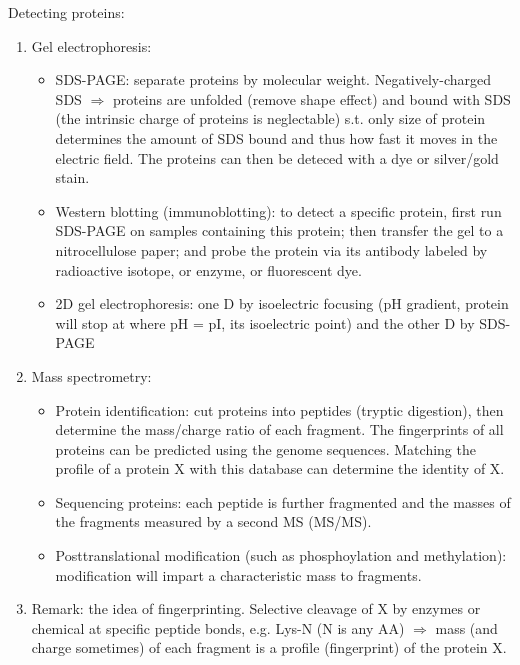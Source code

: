 \documentclass{report}
\begin{document}
Detecting proteins:
\begin{enumerate}
\item Gel electrophoresis:
\begin{itemize}
\item SDS-PAGE: separate proteins by molecular weight. Negatively-charged SDS $\Rightarrow$ proteins are unfolded (remove shape effect) and bound with SDS (the intrinsic charge of proteins is neglectable) s.t. only size of protein determines the amount of SDS bound and thus how fast it moves in the electric field. The proteins can then be deteced with a dye or silver/gold stain. 
\item Western blotting (immunoblotting): to detect a specific protein, first run SDS-PAGE on samples containing this protein; then transfer the gel to a nitrocellulose paper; and probe the protein via its antibody labeled by radioactive isotope, or enzyme, or fluorescent dye. 
\item 2D gel electrophoresis: one D by isoelectric focusing (pH gradient, protein will stop at where pH = pI, its isoelectric point) and the other D by SDS-PAGE
\end{itemize}
	
\item Mass spectrometry:  
\begin{itemize}
	\item Protein identification: cut proteins into peptides (tryptic digestion), then determine the mass/charge ratio of each fragment. The fingerprints of all proteins can be predicted using the genome sequences. Matching the profile of a protein X with this database can determine the identity of X. 
	\item Sequencing proteins: each peptide is further fragmented and the masses of the fragments measured by a second MS (MS/MS). 
	\item Posttranslational modification (such as phosphoylation and methylation): modification will impart a characteristic mass to fragments.  
\end{itemize}

\item Remark: the idea of fingerprinting. Selective cleavage of X by enzymes or chemical at specific peptide bonds, e.g. Lys-N (N is any AA) $\Rightarrow$ mass (and charge sometimes) of each fragment is a profile (fingerprint) of the protein X. 
\end{enumerate}
\end{document}
